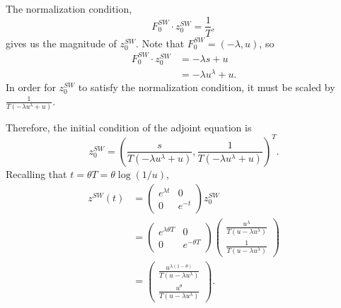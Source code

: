 \documentclass{beamer}
\renewcommand{\matrix}[2]{ \left(\begin{array}{#1} #2 \end{array}\right)}
\begin{document}
\begin{frame}
 \frametitle{\insertsection}
\framesubtitle{\insertsubsection}
The normalization condition,
\begin{equation}
 F_0^{SW}\cdot z^{SW}_0=\frac{1}{T},
\end{equation}
gives us the magnitude of $z_0^{SW}$.  Note that $F_0^{SW} = (-\lambda, u)$, so
\begin{equation}
\begin{split}
 F_0^{SW}\cdot z^{SW}_0 &= -\lambda s + u\\
 & = -\lambda u^\lambda + u.
\end{split}
\end{equation}
In order for $z_0^{SW}$ to satisfy the normalization condition, it must be scaled by $\frac{1}{T(-\lambda u^\lambda + u)}$.
\end{frame}

\begin{frame}
 Therefore, the initial condition of the adjoint equation is
 \begin{equation}
  z_0^{SW} = \left (\frac{s}{T(-\lambda u^\lambda + u)},\frac{1}{T(-\lambda u^\lambda + u)} \right )^T.
 \end{equation}
 Recalling that $t = \theta T = \theta \log(1/u)$,
\begin{equation}
\begin{split}
 z^{SW}(t) &= \matrix{cc}{e^{\lambda t} & 0 \\ 0 & e^{-t}}z_0^{SW}\\
 & = \matrix{cc}{e^{\lambda \theta T} & 0 \\ 0 & e^{-\theta T}} \matrix{c}{  \frac{u^\lambda}{T(u-\lambda u^\lambda)} \\ \frac{1}{T(u-\lambda u^\lambda)}  }\\
 & = \matrix{c}{  \frac{u^{\lambda(1-\theta)}}{T(u-\lambda u^\lambda)} \\ \frac{u^\theta}{T(u-\lambda u^\lambda)}  }.
\end{split}
\end{equation}

 
\end{frame}
\end{document}
